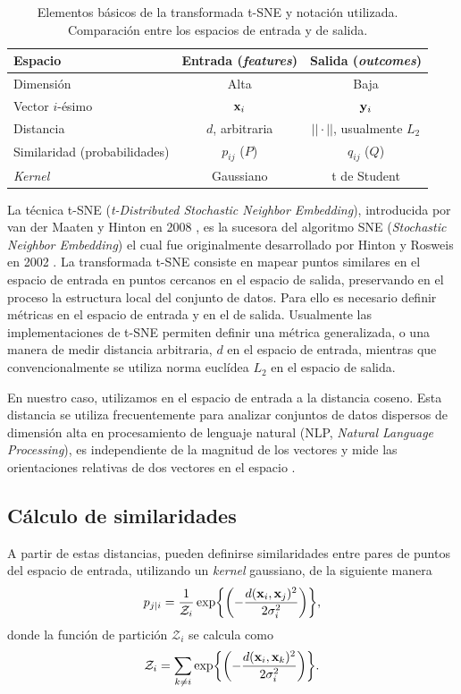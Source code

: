 \begin{table}[!htbp]
\centering
\begin{tabular}{l|cc}
\textbf{Espacio} & \textbf{Entrada} (\textit{features}) & \textbf{Salida} (\textit{outcomes}) \\ \hline
Dimensión & Alta & Baja \\
Vector $i$-ésimo & $\vb{x}_i$ & $\vb{y}_i$ \\
Distancia & $d$, arbitraria & $||\cdot||$, usualmente $L_2$ \\
Similaridad (probabilidades) & $p_{ij}$ ($P$) & $q_{ij}$ ($Q$) \\
\textit{Kernel} & Gaussiano & t de Student
\end{tabular}
\caption{Elementos básicos de la transformada t-SNE y notación utilizada. Comparación entre los espacios de entrada y de salida.}
\label{tab:tsne}
\end{table}

La técnica t-SNE (\textit{t-Distributed Stochastic Neighbor Embedding}), introducida por van der Maaten y Hinton en 2008 \cite{vdm_tsne}, es la sucesora del algoritmo SNE (\textit{Stochastic Neighbor Embedding}) el cual fue originalmente desarrollado por Hinton y Rosweis en 2002 \cite{hinton_sne}. La transformada t-SNE consiste en mapear puntos similares en el espacio de entrada en puntos cercanos en el espacio de salida, preservando en el proceso la estructura local del conjunto de datos. Para ello es necesario definir métricas en el espacio de entrada y en el de salida. Usualmente las implementaciones de t-SNE permiten definir una métrica generalizada, o una manera de medir distancia arbitraria, $d$ en el espacio de entrada, mientras que convencionalmente se utiliza norma euclídea $L_2$ en el espacio de salida.

En nuestro caso, utilizamos en el espacio de entrada a la distancia coseno. Esta distancia se utiliza frecuentemente para analizar conjuntos de datos dispersos de dimensión alta en procesamiento de lenguaje natural (NLP, \textit{Natural Language Processing}), es independiente de la magnitud de los vectores y mide las orientaciones relativas de dos vectores en el espacio \cite{sidorov}.

\subsection{Cálculo de similaridades}\label{subsec:tsne_similaridad}

A partir de estas distancias, pueden definirse similaridades entre pares de puntos del espacio de entrada, utilizando un \textit{kernel} gaussiano, de la siguiente manera
\begin{equation}
    p_{j|i} = \frac{1}{\mathcal{Z}_i} \exp{\left( -\frac{d(\vb{x}_{i}, \vb{x}_{j})^2}{2\sigma_i^2} \right)},
\end{equation}
donde la función de partición $\mathcal{Z}_i$ se calcula como
\begin{equation}
    \mathcal{Z}_i = \sum_{k\neq i}\exp{\left( -\frac{d(\vb{x}_{i}, \vb{x}_{k})^2}{2\sigma_i^2} \right)}.
\end{equation}

